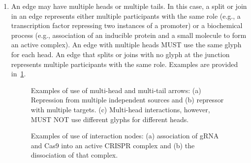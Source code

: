 \begin{enumerate}
\item An edge may have multiple heads or multiple tails. 
In this case, a split or join in an edge represents either multiple participants with the same role (e.g., a transcription factor repressing two instances of a promoter) or a biochemical process (e.g., association of an inducible protein and a small molecule to form an active complex).  
An edge with multiple heads MUST use the same glyph for each head.
An edge that splits or joins with no glyph at the junction represents multiple participants with the same role.
Examples are provided in~\ref{exa:4d}.

	\begin{figure}[h!]
	\centering
	\caption{Examples of use of multi-head and multi-tail arrows: 
	(a) Repression from multiple independent sources and (b) repressor with multiple targets.
	(c) Multi-head interactions, however, MUST NOT use different glyphs for different heads.}
	\label{exa:4d}
	\end{figure}

	\begin{figure}[h!]
	\centering
	\hspace{1.0cm}
	\caption{Examples of use of interaction nodes: 
	(a) association of gRNA and Cas9 into an active CRISPR complex and (b) the dissociation of that complex.}
	\label{exa:4d2}
	\end{figure}


\end{enumerate}
